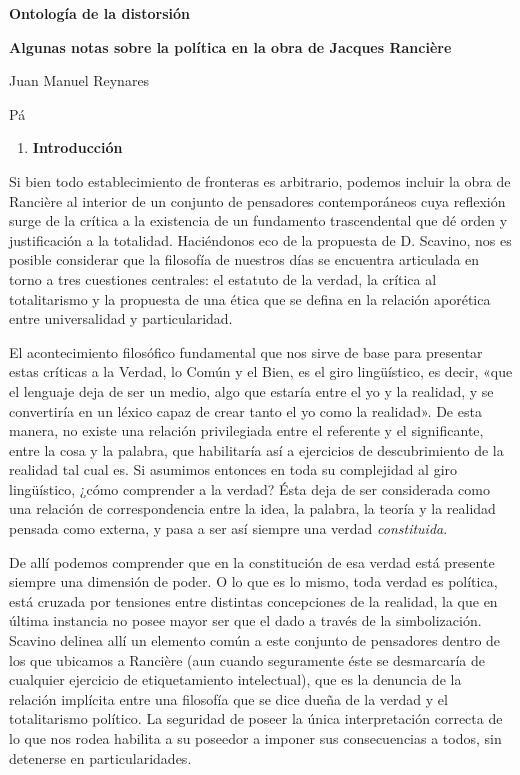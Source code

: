 \textbf{Ontología de la distorsión}

\textbf{Algunas notas sobre la política en la obra de Jacques Rancière}

Juan Manuel Reynares

Pá

\begin{enumerate}
\def\labelenumi{\arabic{enumi}.}
\item
  \textbf{Introducción}
\end{enumerate}

Si bien todo establecimiento de fronteras es arbitrario, podemos incluir la obra de Rancière al interior de un conjunto de pensadores contemporáneos cuya reflexión surge de la crítica a la existencia de un fundamento trascendental que dé orden y justificación a la totalidad. Haciéndonos eco de la propuesta de D. Scavino, nos es posible considerar que la filosofía de nuestros días se encuentra articulada en torno a tres cuestiones centrales: el estatuto de la verdad, la crítica al totalitarismo y la propuesta de una ética que se defina en la relación aporética entre universalidad y particularidad.

El acontecimiento filosófico fundamental que nos sirve de base para presentar estas críticas a la Verdad, lo Común y el Bien, es el giro lingüístico, es decir, «que el lenguaje deja de ser un medio, algo que estaría entre el yo y la realidad, y se convertiría en un léxico capaz de crear tanto el yo como la realidad». De esta manera, no existe una relación privilegiada entre el referente y el significante, entre la cosa y la palabra, que habilitaría así a ejercicios de descubrimiento de la realidad tal cual es. Si asumimos entonces en toda su complejidad al giro lingüístico, ¿cómo comprender a la verdad? Ésta deja de ser considerada como una relación de correspondencia entre la idea, la palabra, la teoría y la realidad pensada como externa, y pasa a ser así siempre una verdad \emph{constituida}.

De allí podemos comprender que en la constitución de esa verdad está presente siempre una dimensión de poder. O lo que es lo mismo, toda verdad es política, está cruzada por tensiones entre distintas concepciones de la realidad, la que en última instancia no posee mayor ser que el dado a través de la simbolización. Scavino delinea allí un elemento común a este conjunto de pensadores dentro de los que ubicamos a Rancière (aun cuando seguramente éste se desmarcaría de cualquier ejercicio de etiquetamiento intelectual), que es la denuncia de la relación implícita entre una filosofía que se dice dueña de la verdad y el totalitarismo político. La seguridad de poseer la única interpretación correcta de lo que nos rodea habilita a su poseedor a imponer sus consecuencias a todos, sin detenerse en particularidades.

